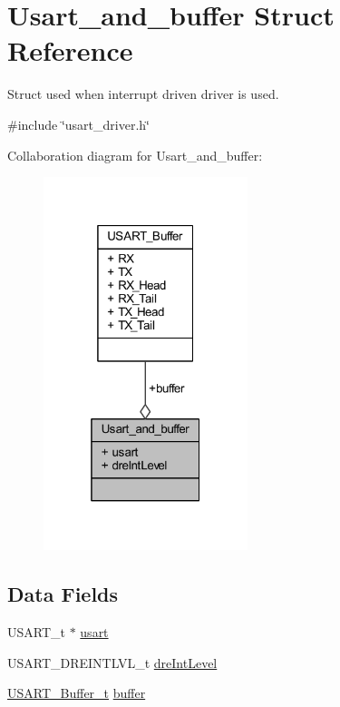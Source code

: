 \hypertarget{struct_usart__and__buffer}{}\section{Usart\+\_\+and\+\_\+buffer Struct Reference}
\label{struct_usart__and__buffer}


Struct used when interrupt driven driver is used.  




{\ttfamily \#include \char`\"{}usart\+\_\+driver.\+h\char`\"{}}



Collaboration diagram for Usart\+\_\+and\+\_\+buffer\+:\nopagebreak
\begin{figure}[H]
\begin{center}
\leavevmode
\includegraphics[width=169pt]{struct_usart__and__buffer__coll__graph}
\end{center}
\end{figure}
\subsection*{Data Fields}
\begin{DoxyCompactItemize}
\item 
U\+S\+A\+R\+T\+\_\+t $\ast$ \hyperlink{struct_usart__and__buffer_a5a819ee5e46999aaae5cb6813014ec08}{usart}
\item 
U\+S\+A\+R\+T\+\_\+\+D\+R\+E\+I\+N\+T\+L\+V\+L\+\_\+t \hyperlink{struct_usart__and__buffer_ad854f355ca0804e81a03cd57c659da59}{dre\+Int\+Level}
\item 
\hyperlink{usart__driver_8h_af27d135e807dcd1846b6f175997c5f45}{U\+S\+A\+R\+T\+\_\+\+Buffer\+\_\+t} \hyperlink{struct_usart__and__buffer_adb062fac585f93e6e48f3d5980e30f22}{buffer}
\end{DoxyCompactItemize}


